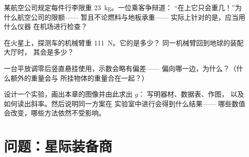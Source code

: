 \begin{exercise}[$\star\star$]\label{exo:g9:weight-vs-mass:9}
某航空公司规定每件行李限重 \qty{23}{kg}。一位乘客争辩道：
“在上它只会重几！”为什么航空公司的限额——
暂且不论燃料与地板承重——
实际上针对的是，应当用什么仪器
在机场进行检查？
\end{exercise}

\begin{exercise}[$\star\star$]\label{exo:g9:weight-vs-mass:10}
在火星上，探测车的机械臂重 \qty{111}{N}。它的是多少？
同一机械臂回到地球的装配大厅时，
其会是多少？
\end{exercise}

\begin{exercise}[$\star\star$]\label{exo:g9:weight-vs-mass:11}
一台平放调零后竖直悬挂使用，示数会略有偏差——
偏向哪一边，为什么？（什么额外的重量会与
所挂物体的重量合在一起？）
\end{exercise}

\begin{exercise}[$\star\star\star$]\label{exo:g9:weight-vs-mass:12}
设计一个实验，画出本章的图像并由此求出 $g$：
写明器材、数据表、作图，
以及如何读出斜率。然后说明同一方案在
实验室中进行会得到什么结果——
哪些数值会改变，哪些方法依然不受影响。
\end{exercise}

\section{问题：星际装备商}

